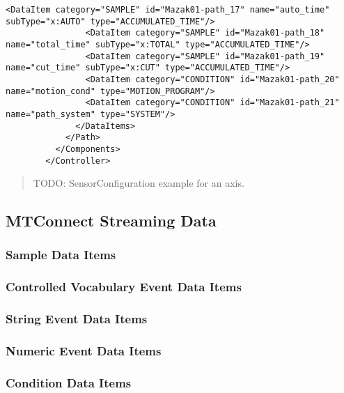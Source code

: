 \begin{lstlisting}[firstnumber=last,%
    caption={Controller and Path Components and Their Data Items},label={lst:controller-component}]
                <DataItem category="SAMPLE" id="Mazak01-path_17" name="auto_time" subType="x:AUTO" type="ACCUMULATED_TIME"/>
                <DataItem category="SAMPLE" id="Mazak01-path_18" name="total_time" subType="x:TOTAL" type="ACCUMULATED_TIME"/>
                <DataItem category="SAMPLE" id="Mazak01-path_19" name="cut_time" subType="x:CUT" type="ACCUMULATED_TIME"/>
                <DataItem category="CONDITION" id="Mazak01-path_20" name="motion_cond" type="MOTION_PROGRAM"/>
                <DataItem category="CONDITION" id="Mazak01-path_21" name="path_system" type="SYSTEM"/>
              </DataItems>
            </Path>
          </Components>
        </Controller>
\end{lstlisting}

\begin{quote}
    \color{red} TODO: SensorConfiguration example for an axis.
\end{quote}

\subsection{MTConnect Streaming Data}

\subsubsection{Sample Data Items}

\subsubsection{Controlled Vocabulary Event Data Items}

\subsubsection{String Event Data Items}

\subsubsection{Numeric Event Data Items}

\subsubsection{Condition Data Items}
